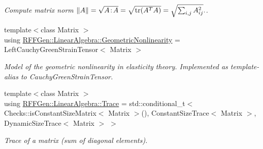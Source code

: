 \begin{DoxyCompactItemize}
\begin{DoxyCompactList}\small\item\em Compute matrix norm $ \|A\| = \sqrt{A\negthinspace : \negthinspace A }= \sqrt{\mathrm{tr}(A^TA)} = \sqrt{\sum_{i,j} A_{ij}^2}. $. \end{DoxyCompactList}\item 
\hypertarget{group__LinearAlgebraGroup_ga435378ac8a773de0a3a8b3b8f67fee0c}{{\footnotesize template$<$class Matrix $>$ }\\using \hyperlink{group__LinearAlgebraGroup_ga435378ac8a773de0a3a8b3b8f67fee0c}{R\-F\-F\-Gen\-::\-Linear\-Algebra\-::\-Geometric\-Nonlinearity} = Left\-Cauchy\-Green\-Strain\-Tensor$<$ Matrix $>$}\label{group__LinearAlgebraGroup_ga435378ac8a773de0a3a8b3b8f67fee0c}

\begin{DoxyCompactList}\small\item\em Model of the geometric nonlinearity in elasticity theory. Implemented as template-\/alias to Cauchy\-Green\-Strain\-Tensor. \end{DoxyCompactList}\item 
\hypertarget{group__LinearAlgebraGroup_ga9f914d8c58f875d06214ca0d46b3c6cb}{{\footnotesize template$<$class Matrix $>$ }\\using \hyperlink{group__LinearAlgebraGroup_ga9f914d8c58f875d06214ca0d46b3c6cb}{R\-F\-F\-Gen\-::\-Linear\-Algebra\-::\-Trace} = std\-::conditional\-\_\-t$<$ Checks\-::is\-Constant\-Size\-Matrix$<$ Matrix $>$(), Constant\-Size\-Trace$<$ Matrix $>$, Dynamic\-Size\-Trace$<$ Matrix $>$ $>$}\label{group__LinearAlgebraGroup_ga9f914d8c58f875d06214ca0d46b3c6cb}

\begin{DoxyCompactList}\small\item\em Trace of a matrix (sum of diagonal elements). \end{DoxyCompactList}\end{DoxyCompactItemize}
